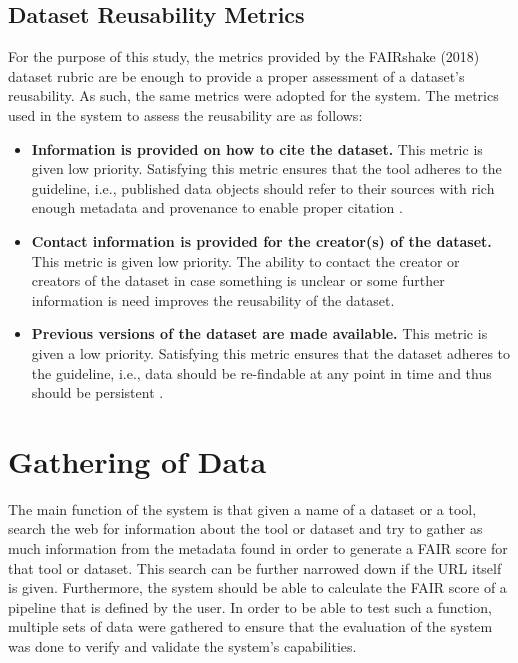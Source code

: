 \documentclass{cisfyp}
\begin{document}
\subsection{Dataset Reusability Metrics}
For the purpose of this study, the metrics provided by the FAIRshake (2018) dataset rubric are be enough to provide a proper assessment of a dataset's reusability. As such, the same metrics were adopted for the system.\newline\newline
The metrics used in the system to assess the reusability are as follows:
\begin{itemize}
	\item \textbf{Information is provided on how to cite the dataset.}\newline
	This metric is given low priority. Satisfying this metric ensures that the tool adheres to the guideline, i.e., published data objects should refer to their sources with rich enough metadata and provenance to enable proper citation \cite{Wilkinson2016}.
	
	\item \textbf{Contact information is provided for the creator(s) of the dataset.}\newline
	This metric is given low priority. The ability to contact the creator or creators of the dataset in case something is unclear or some further information is need improves the reusability of the dataset.
	
	\item \textbf{Previous versions of the dataset are made available.}\newline
	This metric is given a low priority. Satisfying this metric ensures that the dataset adheres to the guideline, i.e., data should be re-findable at any point in time and thus should be persistent \cite{Wilkinson2016}.
\end{itemize}

\section{Gathering of Data}
The main function of the system is that given a name of a dataset or a tool, search the web for information about the tool or dataset and try to gather as much information from the metadata found in order to generate a FAIR score for that tool or dataset. This search can be further narrowed down if the URL itself is given. Furthermore, the system should be able to calculate the FAIR score of a pipeline that is defined by the user.
In order to be able to test such a function, multiple sets of data were gathered to ensure that the evaluation of the system was done to verify and validate the system's capabilities.
\end{document}

